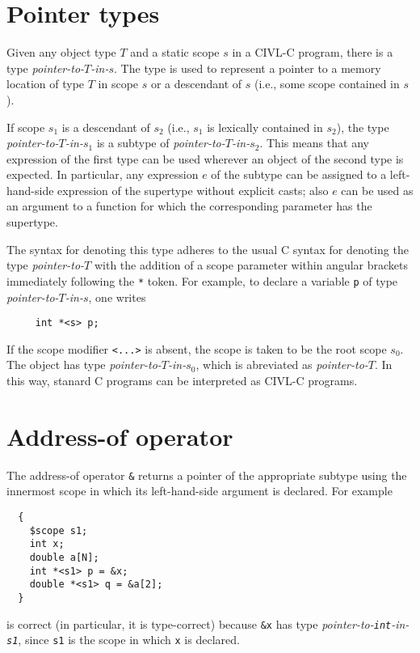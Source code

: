 \documentclass[11pt]{book}
\begin{document}
\section{Pointer types}

Given any object type $T$ and a static scope $s$ in a CIVL-C program,
there is a type \emph{pointer-to-$T$-in-$s$}.  The type is used to
represent a pointer to a memory location of type $T$ in scope $s$ or a
descendant of $s$ (i.e., some scope contained in $s$).

If scope $s_1$ is a descendant of $s_2$ (i.e., $s_1$ is lexically
contained in $s_2$), the type \emph{pointer-to-$T$-in-$s_1$} is a
subtype of \emph{pointer-to-$T$-in-$s_2$}.  This means that any
expression of the first type can be used wherever an object of the
second type is expected.  In particular, any expression $e$ of the
subtype can be assigned to a left-hand-side expression of the
supertype without explicit casts; also $e$ can be used as an argument
to a function for which the corresponding parameter has the supertype.

The syntax for denoting this type adheres to the usual C syntax for
denoting the type \emph{pointer-to-$T$} with the addition of a scope
parameter within angular brackets immediately following the \texttt{*}
token.  For example, to declare a variable \texttt{p} of type
\emph{pointer-to-$T$-in-$s$}, one writes
\begin{verbatim}
     int *<s> p;
\end{verbatim}
If the scope modifier \texttt{<...>} is absent, the scope is taken to
be the root scope $s_0$.  The object has type
\emph{pointer-to-$T$-in-$s_0$}, which is abreviated as
\emph{pointer-to-$T$}.  In this way, stanard C programs can be
interpreted as CIVL-C programs.

\section{Address-of operator}

The address-of operator \texttt{\&} returns a pointer of the
appropriate subtype using the innermost scope in which its left-hand-side
argument is declared.  For example

\begin{verbatim}
  {
    $scope s1;
    int x;
    double a[N];
    int *<s1> p = &x;
    double *<s1> q = &a[2];
  }
\end{verbatim}
is correct (in particular, it is type-correct) because \texttt{\&x}
has type \emph{pointer-to-\texttt{int}-in-\texttt{s1}}, since
\texttt{s1} is the scope in which \texttt{x} is declared.
\end{document}
